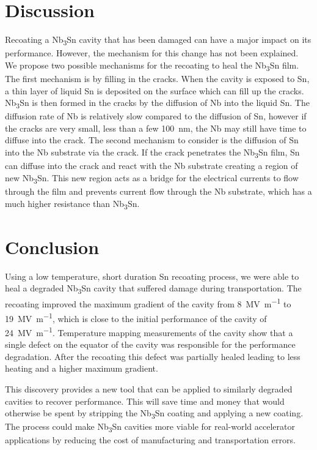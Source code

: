 \documentclass{revtex4-2}
\begin{document}
\section*{Discussion}
\label{sec:Discussion}

Recoating a Nb\textsubscript{3}Sn cavity that has been damaged can have a major impact on its performance. However, the mechanism for this change has not been explained. We propose two possible mechanisms for the recoating to heal the Nb\textsubscript{3}Sn film. The first mechanism is by filling in the cracks. When the cavity is exposed to Sn, a thin layer of liquid Sn is deposited on the surface which can fill up the cracks. Nb\textsubscript{3}Sn is then formed in the cracks by the diffusion of Nb into the liquid Sn. The diffusion rate of Nb is relatively slow compared to the diffusion of Sn, however if the cracks are very small, less than a few \qty{100}{nm}, the Nb may still have time to diffuse into the crack. The second mechanism to consider is the diffusion of Sn into the Nb substrate via the crack. If the crack penetrates the Nb\textsubscript{3}Sn film, Sn can diffuse into the crack and react with the Nb substrate creating a region of new Nb\textsubscript{3}Sn. This new region acts as a bridge for the electrical currents to flow through the film and prevents current flow through the Nb substrate, which has a much higher resistance than Nb\textsubscript{3}Sn. 




\section{Conclusion}
\label{sec:Conclusion}

Using a low temperature, short duration Sn recoating process, we were able to heal a degraded Nb\textsubscript{3}Sn cavity that suffered damage during transportation. The recoating improved the maximum gradient of the cavity from \qty{8}{\mega\volt\per\meter} to \qty{19}{\mega\volt\per\meter}, which is close to the initial performance of the cavity of \qty{24}{\mega\volt\per\meter}. Temperature mapping measurements of the cavity show that a single defect on the equator of the cavity was responsible for the performance degradation. After the recoating this defect was partially healed leading to less heating and a higher maximum gradient.

This discovery provides a new tool that can be applied to similarly degraded cavities to recover performance. This will save time and money that would otherwise be spent by stripping the Nb\textsubscript{3}Sn coating and applying a new coating. The process could make Nb\textsubscript{3}Sn cavities more viable for real-world accelerator applications by reducing the cost of manufacturing and transportation errors.





\end{document}
